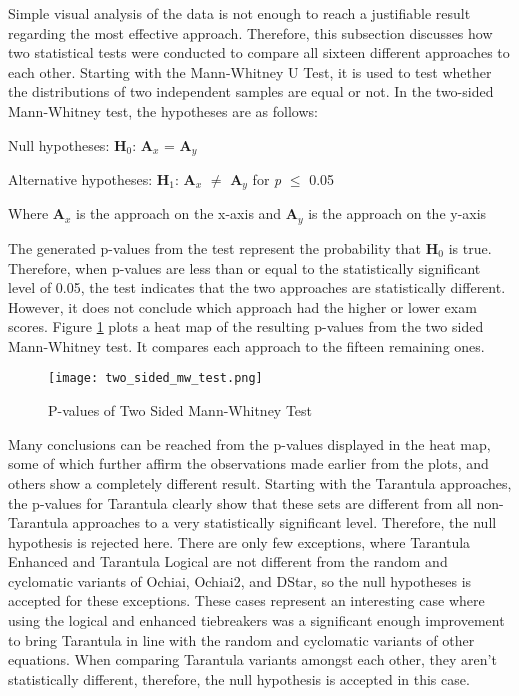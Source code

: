 Simple visual analysis of the data is not enough to reach a justifiable result
regarding the most effective approach. Therefore, this subsection discusses how
two statistical tests were conducted to compare all sixteen different approaches to
each other. Starting with the Mann-Whitney U Test, it is used to test whether
the distributions of two independent samples are equal or not. In the two-sided
Mann-Whitney test, the hypotheses are as follows:
\begin{center}
    Null hypotheses: \textbf{H$_{0}$}: \textbf{A$_{x}$} = \textbf{A$_{y}$}

    Alternative hypotheses: \textbf{H$_{1}$}: \textbf{A$_{x}$} $\neq$
    \textbf{A$_{y}$}
    for \emph{p} $\leq$  0.05

    Where \textbf{A$_{x}$} is the approach on the x-axis and \textbf{A$_{y}$} is
    the approach on the y-axis
\end{center}

The generated p-values from the test represent the probability that
\textbf{H$_{0}$} is true. Therefore, when p-values are less than or equal to the statistically
significant level of 0.05, the test indicates that the two approaches are
statistically different. However, it does not conclude which approach had the
higher or lower exam scores. Figure \ref{fig:two_sided_mw_test} plots a heat map
of the resulting p-values from the two sided Mann-Whitney test. It compares each
approach to the fifteen remaining ones.

\begin{figure}[!htb]
	\begin{center}
		\texttt{[image: two\_sided\_mw\_test.png]}
        \caption{\label{fig:two_sided_mw_test} P-values of Two Sided Mann-Whitney Test}
	\end{center}
\end{figure}

Many conclusions can be reached from the p-values displayed in the heat map,
some of which further affirm the observations made earlier from the plots, and
others show a completely different result. Starting with the Tarantula
approaches, the p-values for Tarantula clearly
show that these sets are different from all non-Tarantula approaches to a very
statistically significant level.
Therefore, the null hypothesis is rejected
here. There are only few exceptions, where Tarantula Enhanced and Tarantula
Logical are not different from the random and cyclomatic variants of Ochiai,
Ochiai2, and DStar, so the null hypotheses is accepted for these exceptions.
These cases represent an interesting case where using the logical and enhanced
tiebreakers was a significant enough improvement to bring Tarantula in line with
the random and cyclomatic variants of other equations.
When comparing Tarantula variants amongst each other, they aren't statistically
different, therefore, the null hypothesis is
accepted in this case.

